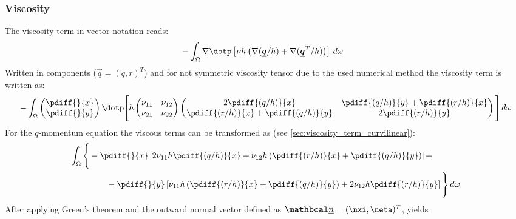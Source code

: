 \subsubsection{Viscosity}

The viscosity term in vector notation reads:
\begin{align}
    &-\int_\Omega \nabla \dotp \left[ \nu h \left(  \nabla (\vec{q}/h) + \nabla (\vec{q}^T/h) \right) \right] \, d\omega
\end{align}
%
Written in components ($\vec{q} = (q, r)^T$) and for not symmetric viscosity tensor due to the used numerical method
the viscosity term is written as:
\begin{align}
    - \int_{\Omega}
    \begin{pmatrix}
        \pdiff{}{x} \\
        \pdiff{}{y}
    \end{pmatrix}
    \dotp
    \Bigg[
    h
    \begin{pmatrix}
        \nu_{11} & \nu_{12} \\
        \nu_{21}  & \nu_{22}
    \end{pmatrix}
    \begin{pmatrix}
        2\pdiff{(q/h)}{x} & \pdiff{(q/h)}{y} + \pdiff{(r/h)}{x}
        \\
        \pdiff{(r/h)}{x} + \pdiff{(q/h)}{y} & 2\pdiff{(r/h)}{y}
    \end{pmatrix}
    \Bigg]
    \, d\omega
\end{align}
For the $q$-momentum equation the viscous terms can be transformed as (see \autoref{sec:viscosity_term_curvilinear}):
%
\begin{align}
    \int_{\Omega} \Bigg\{
    &-\pdiff{}{x} \left[  2 \nu_{11} h \pdiff{(q/h)}{x} + \nu_{12} h \left(\pdiff{(r/h)}{x} + \pdiff{(q/h)}{y}\right) \right] +
    \\
    &\qquad
    - \pdiff{}{y} \left[ \nu_{11} h \left( \pdiff{(r/h)}{x} + \pdiff{(q/h)}{y}  \right) + 2 \nu_{12} h \pdiff{(r/h)}{y} \right]
    \Bigg\} \, d\omega
\end{align}
After applying Green's theorem and the outward normal vector defined as  $\vecn = (\nxi, \neta)^T$, yields
